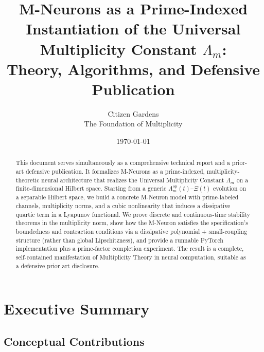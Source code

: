 \documentclass[11pt]{article}
\title{M-Neurons as a Prime-Indexed Instantiation of the Universal Multiplicity Constant
\(\Lambda_m\): \\
Theory, Algorithms, and Defensive Publication}
\author{Citizen Gardens \\ The Foundation of Multiplicity}
\date{\today}
\begin{document}
\maketitle

\begin{abstract}
This document serves simultaneously as a comprehensive technical report and a prior-art defensive publication.
It formalizes M-Neurons as a prime-indexed, multiplicity-theoretic neural architecture that realizes the Universal Multiplicity Constant \(\Lambda_m\) on a finite-dimensional Hilbert space.
Starting from a generic \(\Lambda_m^{\mathrm{op}}(t)\)–\(\Xi(t)\) evolution on a separable Hilbert space, we build a concrete M-Neuron model with prime-labeled channels, multiplicity norms, and a cubic nonlinearity that induces a dissipative quartic term in a Lyapunov functional.
We prove discrete and continuous-time stability theorems in the multiplicity norm, show how the M-Neuron satisfies the specification's boundedness and contraction conditions via a dissipative polynomial + small-coupling structure (rather than global Lipschitzness), and provide a runnable PyTorch implementation plus a prime-factor completion experiment.
The result is a complete, self-contained manifestation of Multiplicity Theory in neural computation, suitable as a defensive prior art disclosure.
\end{abstract}
\newpage
\tableofcontents

\section{Executive Summary}

\subsection{Conceptual Contributions}
\end{document}
